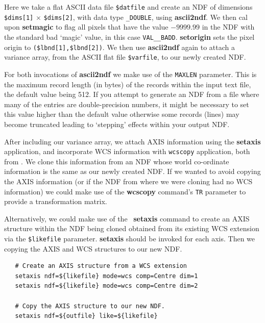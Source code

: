 \documentclass[twoside,11pt]{article}
\newcommand{\xref}[3]{#1}
\newcommand{\xlabel}[1]{}
\begin{document}
{Here we take a flat ASCII data file \verb+$datfile+ and create an NDF
of dimensions \verb+$dims[1]+ $\times$ \verb+$dims[2]+, with data type
{\tt \_DOUBLE}, using {\bf ascii2ndf}.  We then cal upon
\xref{{\bf setmagic}}{sun95}{SETMAGIC} to flag all pixels that have the
value $-9999.99$ in the NDF with the \xref{standard bad `magic'
value}{sun95}{se_masking}, in this case {\tt VAL\_\_BADD}.  
\xref{{\bf setorigin}}{sun95}{SETORIGIN} sets the pixel origin 
to \verb+($lbnd[1],$lbnd[2])+.  We then use {\bf ascii2ndf} again to
attach a variance array, from the ASCII flat file \verb+$varfile+, to
our newly created NDF.

For both invocations of {\bf ascii2ndf} we make use of the {\tt MAXLEN}
parameter.  This is the maximum record length (in bytes) of the records
within the input text file, the default value being 512.  If you
attempt to generate an NDF from a file where many of the entries are
double-precision numbers, it might be necessary to set this value
higher than the default value otherwise some records (lines) may
become truncated leading to `stepping' effects within your output
NDF.

After including our variance array, we attach AXIS information using
the \xref{{\bf setaxis}}{sun95}{SETAXIS} application, and incorporate WCS
information with \xref{{\tt wcscopy}}{sun95}{WCSCOPY} application, both from
\KAPPA.  We clone this information from an NDF whose world co-ordinate
information is the same as our newly created NDF.  If we wanted to
avoid copying the AXIS information (or if the NDF from where we were
cloning had no WCS information) we could make use of the
\xref{{\bf wcscopy}}{sun95}{WCSCOPY} command's {\tt TR} parameter to provide
a transformation matrix.  

\label{sc16_wcs2axis}\xlabel{sc16_wcs2axis}
Alternatively, we could make use of the \KAPPA\ {\bf setaxis} command
to create an AXIS structure within the NDF being cloned obtained from
its existing WCS extension via the
\verb+$likefile+ parameter.  {\bf setaxis} should be invoked for each
axis.  Then we copying the AXIS and WCS structures to our new NDF.

\small\begin{verbatim}
   # Create an AXIS structure from a WCS extension
   setaxis ndf=${likefile} mode=wcs comp=Centre dim=1
   setaxis ndf=${likefile} mode=wcs comp=Centre dim=2
   
   # Copy the AXIS structure to our new NDF.
   setaxis ndf=${outfile} like=${likefile}
   

\end{verbatim}}
\end{document}
